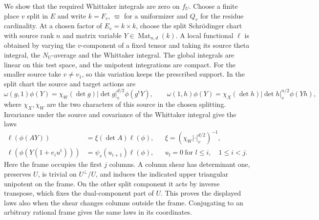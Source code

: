 We show that the required Whittaker integrals are zero on \(f_U\).
Choose a finite place \(v\) split in \(E\) and write \(k=F_v\),
\(\varpi\) for a uniformizer and \(Q_v\) for the residue cardinality.
At a chosen factor of \(E_v=k\times k\), choose the split
Schr\"odinger chart with source rank \(n\) and matrix variable
\(Y\in\operatorname{Mat}_{n,d}(k)\). A local functional \(\ell\)
is obtained by varying the \(v\)-component of a fixed tensor and
taking its source theta integral, the \(N_U\)-average and the
Whittaker integral. The global integrals are linear on this test
space, and the unipotent integrations are compact. For the smaller
source take \(v\ne v_1\), so this variation keeps the prescribed
support. In the split chart the source and target actions are
\[
 \omega(g,1)\phi(Y)=\chi_W(\det g)|\det g|_v^{d/2}\phi(g^{\mathrm t}Y),
 \qquad
 \omega(1,h)\phi(Y)=\chi_X(\det h)|\det h|_v^{n/2}\phi(Yh),
\]
where \(\chi_X,\chi_W\) are the two characters of this source in the
chosen splitting. Invariance under the source and covariance of the
Whittaker integral give the laws
\begin{align*}
 \ell(\phi(AY))&=\xi(\det A)\ell(\phi),
 &&\xi=(\chi_W|\cdot|_v^{d/2})^{-1},\\
 \ell(\phi(Y(1+e_i u^{\mathrm t})))&=\psi_v(u_{i+1})\ell(\phi),
 && u_l=0\ \text{for }l\le i,\quad 1\le i<j.
\end{align*}
Here the frame occupies the first \(j\) columns. A column shear has
determinant one, preserves \(U\), is trivial on \(U^\perp/U\), and
induces the indicated upper triangular unipotent on the frame. On the
other split component it acts by inverse transpose, which fixes the
dual-component part of \(U\). This proves the displayed laws also
when the shear changes columns outside the frame. Conjugating to an
arbitrary rational frame gives the same laws in its coordinates.

